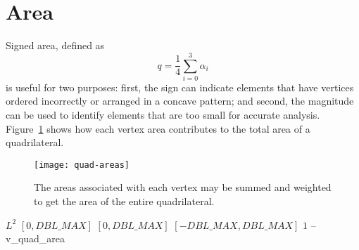 \section{Area\label{s:quad-area}}

Signed area, defined as
\[
q = \frac {1} {4} \sum_{i=0}^3 \alpha_i
\]
is useful for two purposes: first, the sign can indicate elements
that have vertices ordered incorrectly or arranged in a concave
pattern; and second, the magnitude can be used to identify
elements that are too small for accurate analysis.
Figure~\ref{f:quad-areas} shows how each vertex area contributes to
the total area of a quadrilateral.

\begin{figure}[htb]
  \centering
  \texttt{[image: quad-areas]}
  \caption{The areas associated with each vertex may be summed and
           weighted to get the area of the entire quadrilateral.%
                                                                  \label{f:quad-areas}}
\end{figure}

%
{$L^2$}%
{$[0,DBL\_MAX]$}%
{$[0,DBL\_MAX]$}%
{$[-DBL\_MAX,DBL\_MAX]$}%
{$1$}%
{--}%
{v\_quad\_area}%

